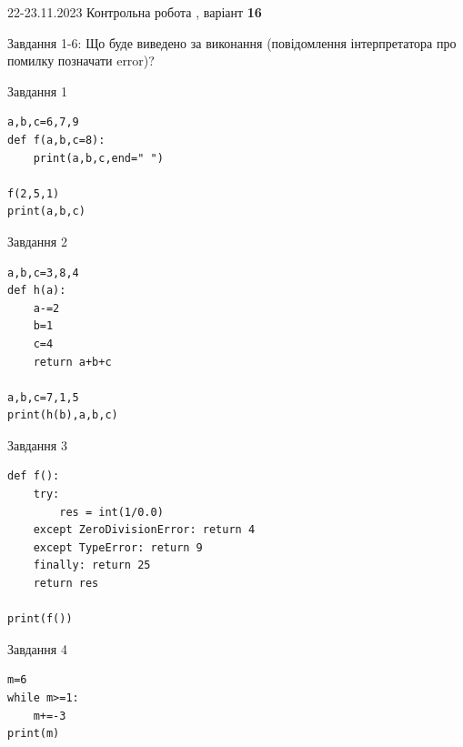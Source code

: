 \documentclass[12pt, ukrainian]{article}
\begin{document}
{{22-23.11.2023 Контрольна робота , варіант  \No \textbf { 16 }\par}}
{

Завдання 1-6: Що буде виведено за виконання (повідомлення інтерпретатора про помилку позначати error)?


\begin{minipage}[t]{9.7cm}                
{\begin{center}Завдання {1}\end{center}}
\begin{verbatim}
a,b,c=6,7,9
def f(a,b,c=8):
    print(a,b,c,end=" ")

f(2,5,1)
print(a,b,c)
\end{verbatim}     
\end{minipage}
\vline \hspace{8mm}
\begin{minipage}[t]{8.0cm}                
{\begin{center}Завдання {2}\end{center}}
\begin{verbatim}
a,b,c=3,8,4
def h(a):
    a-=2
    b=1
    c=4
    return a+b+c

a,b,c=7,1,5
print(h(b),a,b,c)
\end{verbatim}     
\end{minipage}

\vspace{15mm}
\begin{minipage}[t]{9.7cm}                
{\begin{center}Завдання {3}\end{center}}
\begin{verbatim}
def f():
    try:
        res = int(1/0.0)
    except ZeroDivisionError: return 4
    except TypeError: return 9
    finally: return 25
    return res

print(f())
\end{verbatim}     
\end{minipage}
\vline \hspace{8mm}
\begin{minipage}[t]{8.0cm}                
{\begin{center}Завдання {4}\end{center}}
\begin{verbatim}
m=6
while m>=1:
    m+=-3
print(m)
\end{verbatim}     
\end{minipage}

}
\end{document}
